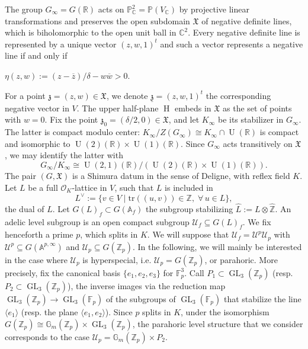 \documentclass[12pt,a4paper,reqno]{amsart}
\theoremstyle{definition}
\numberwithin{definition}{subsection}
\theoremstyle{definition}
\numberwithin{Definition}{subsection}
\theoremstyle{remark}
\theoremstyle{remark}
\numberwithin{Remark}{subsection}
\theoremstyle{remark}
\theoremstyle{plain}
\numberwithin{Theorem}{subsection}
\theoremstyle{plain}
\theoremstyle{plain}
\theoremstyle{plain}
\theoremstyle{plain}
\theoremstyle{plain}
\theoremstyle{plain}
\theoremstyle{plain}
\newcommand*{\Z}{\mathbb{Z}}
\newcommand*{\R}{\mathbb{R}}
\newcommand*{\Cc}{\mathbb{C}}
\newcommand*{\F}{\mathbb{F}}
\DeclareMathOperator{\GL}{GL}
\DeclareMathOperator{\U}{U}
\DeclareMathOperator{\h}{H}
\begin{document}
The group $G_\infty=G(\R)$ acts on $\mathbb{P}^2_\Cc=\mathbb{P}(V_\Cc)$ by projective linear transformations and preserves the open subdomain $\mathfrak{X}$ of negative definite lines, which is biholomorphic to the open unit ball in $\Cc^2$. Every negative definite line is represented by a unique vector $(z,w,1)^t$ and such a vector represents a negative line if and only if
\begin{center}
    $\eta(z,w):= (z-\overline{z})/\delta-w\overline{w}> 0$.
\end{center}
For a point $\mathfrak{z}=(z,w)\in \mathfrak{X}$, we denote $\underline{\mathfrak{z}}=(z,w,1)^t$ the corresponding negative vector in $V$.
The upper half-plane $\h$ embeds in $\mathfrak{X}$ as the set of points with $w=0$.
Fix the point $\mathfrak{z}_0=(\delta/2,0)\in \mathfrak{X}$, and let $K_\infty$ be its stabilizer in $G_\infty$. The latter is compact modulo center: $K_\infty/Z(G_\infty)\cong K_\infty \cap \U(\R)$ is compact and isomorphic to $\U(2)(\R)\times \U(1)(\R)$. Since $G_\infty$ acts transitively on $\mathfrak{X}$, we may identify the latter with 
\[
G_\infty/K_\infty\cong \U(2,1)(\R)/(\U(2)(\R)\times \U(1)(\R)).
\] 
The pair $(G,\mathfrak{X})$ is a Shimura datum in the sense of Deligne, with reflex field $K$. Let $L$ be a full $\mathcal{O}_{K}$-lattice in $V$, such that $L$ is included in
\[
L^\vee:=\{v\in V\mid \text{tr}((u,v))\in \Z,\; \forall\, u\in L\},
\]
the dual of $L$. Let $G(L)_f\subset G(\mathbb{A}_f)$ the subgroup stabilizing $\hat{L}:=L\otimes \hat{\Z}$. An adelic level subgroup is an open compact subgroup $\mathcal{U}_f\subseteq G(L)_f$. We fix henceforth a prime $p$, which splits in $K$. We will suppose that $\mathcal{U}_f=\mathcal{U}^p\mathcal{U}_p$ with $\mathcal{U}^p\subseteq G(\mathbb{A}^{p,\infty})$ and $\mathcal{U}_p\subseteq G(\Z_p)$. In the following, we will mainly be interested in the case where $\mathcal{U}_p$ is hyperspecial, i.e. $\mathcal{U}_p=G(\Z_p)$, or parahoric. More precisely, fix the canonical basis $\{e_1,e_2,e_3\}$ for $\F_p^3$. Call $P_1\subset \GL_3(\Z_p)$ (resp. $P_2\subset \GL_3(\Z_p)$), the inverse images via the reduction map $\GL_3(\Z_p)\to \GL_3(\F_p)$ of the subgroups of $\GL_3(\F_p)$ that stabilize the line $\langle e_1\rangle$ (resp. the plane $\langle e_1,e_2\rangle$). 
Since $p$ splits in $K$, under the isomorphism $G(\Z_p)\cong \mathbb{G}_m(\Z_p)\times \GL_3(\Z_p)$, the parahoric level structure that we consider corresponds to the case $\mathcal{U}_p=\mathbb{G}_m(\Z_p)\times P_2$. 
\end{document}
